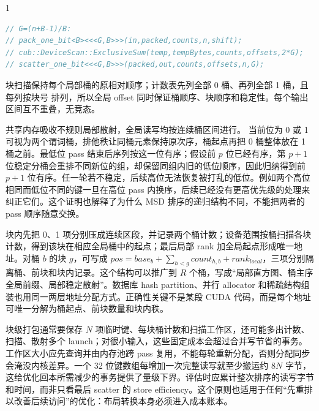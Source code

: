 \begin{solutionexercise}{1}
\begin{lstlisting}[language=C++]
// G=(n+B-1)/B:
// pack_one_bit<B><<<G,B>>>(in,packed,counts,n,shift);
// cub::DeviceScan::ExclusiveSum(temp,tempBytes,counts,offsets,2*G);
// scatter_one_bit<<<G,B>>>(packed,out,counts,offsets,n,G);
\end{lstlisting}
块扫描保持每个局部桶的原相对顺序；计数表先列全部 0 桶、再列全部 1 桶，且每列按块号
排列，所以全局 offset 同时保证桶顺序、块顺序和稳定性。每个输出区间互不重叠，无竞态。

\conclusionheading 共享内存吸收不规则局部散射，全局读写均按连续桶区间进行。
\discussionheading
{}当前位为 0 或 1 可视为两个谓词桶，排他秩让同桶元素保持原次序，桶起点再把 0 桶整体放在 1 桶之前。最低位 pass 结束后序列按这一位有序；假设前 $p$ 位已经有序，第 $p+1$ 位稳定分桶会重排不同新位的组，却保留同组内旧的低位顺序，因此归纳得到前 $p+1$ 位有序。任一轮若不稳定，后续高位无法恢复被打乱的低位。例如两个高位相同而低位不同的键一旦在高位 pass 内换序，后续已经没有更高优先级的处理来纠正它们。这个证明也解释了为什么 MSD 排序的递归结构不同，不能把两者的 pass 顺序随意交换。

块内先把 0、1 项分别压成连续区段，并记录两个桶计数；设备范围按桶扫描各块计数，得到该块在相应全局桶中的起点；最后局部 rank 加全局起点形成唯一地址。对桶 $b$ 的块 $g$，可写成 $pos=base_b+\sum_{h<g}count_{h,b}+rank_{local}$，三项分别隔离桶、前块和块内记录。这个结构可以推广到 $R$ 个桶，写成“局部直方图、桶主序全局前缀、局部稳定散射”。数据库 hash partition、并行 allocator 和稀疏结构组装也用同一两层地址分配方式。正确性关键不是某段 CUDA 代码，而是每个地址可唯一分解为桶起点、前块数量和块内秩。

块级打包通常要保存 $N$ 项临时键、每块桶计数和扫描工作区，还可能多出计数、扫描、散射多个 launch；对很小输入，这些固定成本会超过合并写节省的事务。工作区大小应先查询并由内存池跨 pass 复用，不能每轮重新分配，否则分配同步会淹没内核差异。一个 32 位键数组每增加一次完整读写就至少搬运约 $8N$ 字节，这给优化回本所需减少的事务提供了量级下界。评估时应累计整次排序的读写字节和时间，而非只看最后 scatter 的 store efficiency。这个原则也适用于任何“先重排以改善后续访问”的优化：布局转换本身必须进入成本账本。


\end{solutionexercise}

